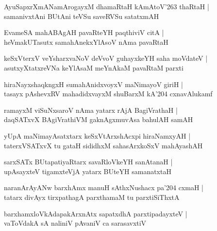 \documentclass[twoside,12pt,openright]{book}
\newcounter{shloka}[chapter]
\begin{document}
\begin{shloka}
AyuSapxrXmANamArogayxM dhamaRtaH kAmAtoV\char'263 thaRtaH |\\
samanivxtAni BUtAni teVSu saveRVSu satatxmAH
\end{shloka}

\begin{shloka}
EvameSA mahABAgAH pavaRteYH paqthiviV citA |\\
heVmakUTasutx samahAnekxYlAsoV nAma pavaRtaH
\end{shloka}

\begin{shloka}
keSxVterxV veYsharxvaNoV deVvoV guhayxkeYH saha moVdateV |\\
asutxyXtatxreVNa keYlAsaM meYnAkaM pavaRtaM parxti
\end{shloka}

\begin{shloka}
hiraNayxshaqkngxH sumahAnidxvoyxV maNimayoV giriH |\\
tasayx pAshevxRV mahadidxvayxM shuBarxM kA\char'204 cxnavAlukamf
\end{shloka}

\begin{shloka}
ramayxM viSuNxsaroV nAma yatarx rAjA BagiVrathaH |\\
daqSATxvX BAgiVrathiVM gaknAgxmuvAsa bahulAH samAH
\end{shloka}

\begin{shloka}
yUpA maNimayAsatxtarx keSxVtArxshAcxpi hiraNamxyAH |\\
taterxVSATxvX tu gataH sididhxM sahasArxkoSxV mahAyashAH
\end{shloka}


\begin{shloka}
sarxSATx BUtapatiyaRtarx savaRloVkeYH sanAtanaH |\\
upAsayxteV tigamxteVjA yatarx BUteYH samanatxtaH
\end{shloka}

\begin{shloka}
naranArAyANw barxhAmx manuH sAthxNushacx pa\char'204 cxmaH |\\
tatarx divAyx tirxpathagA parxthamaM tu parxtiSiThxtA
\end{shloka}

\begin{shloka}
barxhamxloVkAdapakArxnAtx sapatxdhA parxtipadayxteV |\\
vaToVdakA sA naliniV pAvaniV ca sarasavxtiV 
\end{shloka}
\end{document}
